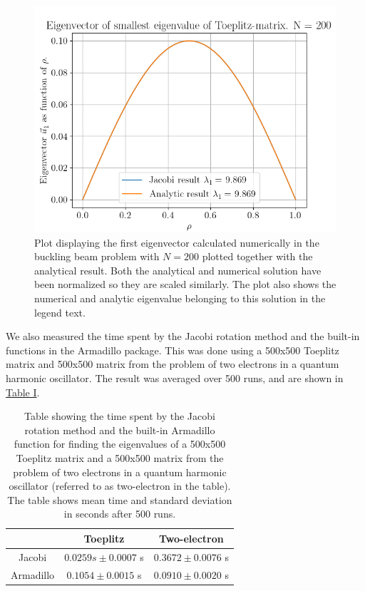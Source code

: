 \documentclass[reprint,english,notitlepage]{revtex4-1}  %
\begin{document}
\begin{figure}[H] \label{fig:IV:a:1}
\includegraphics[width=\columnwidth]{toeplitz.png}
\caption{Plot displaying the first eigenvector calculated numerically in the buckling beam problem with $N=200$ plotted together with the analytical result. Both the analytical and numerical solution have been normalized so they are scaled similarly. The plot also shows the numerical and analytic eigenvalue belonging to this solution in the legend text.}
\end{figure}

We also measured the time spent by the Jacobi rotation method and the built-in functions in the Armadillo package. This was done using a 500x500 Toeplitz matrix and 500x500 matrix from the problem of two electrons in a quantum harmonic oscillator. The result was averaged over 500 runs, and are shown in \hyperref[table:IV:a:1]{Table I}.

\begin{table}[h!] \label{table:IV:a:1}
\caption{Table showing the time spent by the Jacobi rotation method and the built-in Armadillo function for finding the eigenvalues of a 500x500 Toeplitz matrix and a 500x500 matrix from the problem of two electrons in a quantum harmonic oscillator (referred to as two-electron in the table). The table shows mean time and standard deviation in seconds after 500 runs.}
\begin{tabular}{|c|c|c|}
\hline
 & Toeplitz & Two-electron \\
\hline
Jacobi & $0.0259 s \pm 0.0007$ s & $0.3672 \pm 0.0076$ s \\
Armadillo & $0.1054 \pm 0.0015$ s & $0.0910 \pm 0.0020$ s \\
\hline
\end{tabular}
\end{table}
\end{document}
